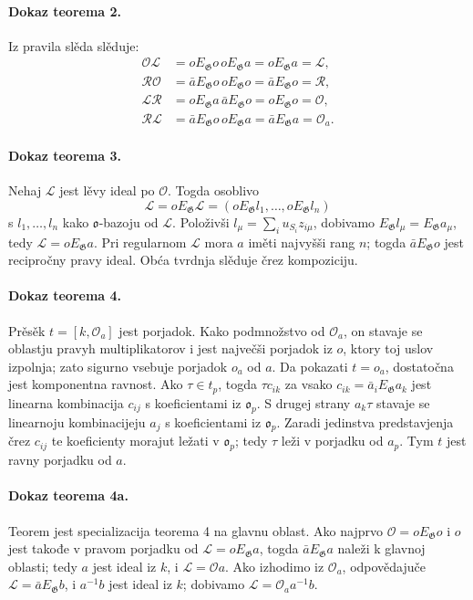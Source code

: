 \documentclass[11pt]{article}
\providecommand{\Gg}{\mathfrak G}
\providecommand{\oo}{\mathfrak o}
\begin{document}
\paragraph{Dokaz teorema 2.}
Iz pravila slěda slěduje:
\[
\begin{aligned}
 \mathcal O\mathcal L&=oE_\Gg o\,oE_\Gg a=oE_\Gg a=\mathcal L,\\
 \mathcal R\mathcal O&=\bar aE_\Gg o\,oE_\Gg o=\bar aE_\Gg o=\mathcal R,\\
 \mathcal L\mathcal R&=oE_\Gg a\,\bar aE_\Gg o=oE_\Gg o=\mathcal O,\\
 \mathcal R\mathcal L&=\bar aE_\Gg o\,oE_\Gg a=\bar aE_\Gg a=\mathcal O_a.
\end{aligned}
\]

\paragraph{Dokaz teorema 3.}
Nehaj \(\mathcal L\) jest lěvy ideal po \(\mathcal O\). Togda osoblivo
\[
        \mathcal L=oE_\Gg\mathcal L
        =(oE_\Gg l_1,\ldots,oE_\Gg l_n)
\]
s \(l_1,\ldots,l_n\) kako \(\oo\)-bazoju od \(\mathcal L\). Položivši \(l_\mu=\sum_i u_{S_i}z_{i\mu}\), dobivamo \(E_\Gg l_\mu=E_\Gg a_\mu\), tedy \(\mathcal L=oE_\Gg a\). Pri regularnom \(\mathcal L\) mora \(a\) iměti najvyšši rang \(n\); togda \(\bar aE_\Gg o\) jest recipročny pravy ideal. Obća tvrdnja slěduje črez kompoziciju.

\paragraph{Dokaz teorema 4.}
Prěsěk \(t=[k,\mathcal O_a]\) jest porjadok. Kako podmnožstvo od \(\mathcal O_a\), on stavaje se oblastju pravyh multiplikatorov i jest največši porjadok iz \(o\), ktory toj uslov izpolnja; zato sigurno vsebuje porjadok \(o_a\) od \(a\). Da pokazati \(t=o_a\), dostatočna jest komponentna ravnost. Ako \(\tau\in t_p\), togda \(\tau c_{ik}\) za vsako \(c_{ik}=\bar a_iE_\Gg a_k\) jest linearna kombinacija \(c_{ij}\) s koeficientami iz \(\oo_p\). S drugej strany \(a_k\tau\) stavaje se linearnoju kombinacijeju \(a_j\) s koeficientami iz \(\oo_p\). Zaradi jedinstva predstavjenja črez \(c_{ij}\) te koeficienty morajut ležati v \(\oo_p\); tedy \(\tau\) leži v porjadku od \(a_p\). Tym \(t\) jest ravny porjadku od \(a\).

\paragraph{Dokaz teorema 4a.}
Teorem jest specializacija teorema 4 na glavnu oblast. Ako najprvo \(\mathcal O=oE_\Gg o\) i \(o\) jest takođe v pravom porjadku od \(\mathcal L=oE_\Gg a\), togda \(\bar aE_\Gg a\) naleži k glavnoj oblasti; tedy \(a\) jest ideal iz \(k\), i \(\mathcal L=\mathcal O a\). Ako izhodimo iz \(\mathcal O_a\), odpovědajuče \(\mathcal L=\bar aE_\Gg b\), i \(a^{-1}b\) jest ideal iz \(k\); dobivamo \(\mathcal L=\mathcal O_a a^{-1}b\).
\end{document}
